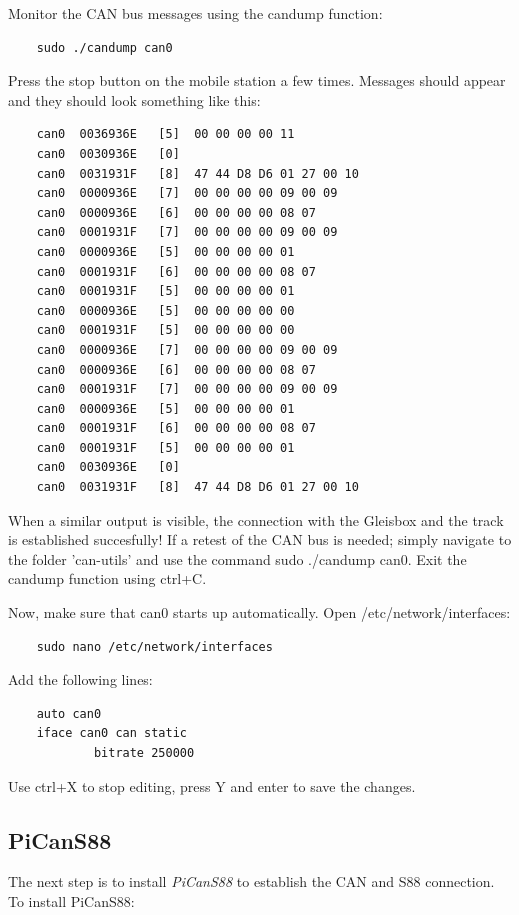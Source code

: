 Monitor the CAN bus messages using the candump function:

\begin{verbatim}
	sudo ./candump can0
\end{verbatim}

Press the stop button on the mobile station a few times. Messages should appear and they should look something like this:

\begin{verbatim}
	can0  0036936E   [5]  00 00 00 00 11
	can0  0030936E   [0]
	can0  0031931F   [8]  47 44 D8 D6 01 27 00 10
	can0  0000936E   [7]  00 00 00 00 09 00 09
	can0  0000936E   [6]  00 00 00 00 08 07
	can0  0001931F   [7]  00 00 00 00 09 00 09
	can0  0000936E   [5]  00 00 00 00 01
	can0  0001931F   [6]  00 00 00 00 08 07
	can0  0001931F   [5]  00 00 00 00 01
	can0  0000936E   [5]  00 00 00 00 00
	can0  0001931F   [5]  00 00 00 00 00
	can0  0000936E   [7]  00 00 00 00 09 00 09
	can0  0000936E   [6]  00 00 00 00 08 07
	can0  0001931F   [7]  00 00 00 00 09 00 09
	can0  0000936E   [5]  00 00 00 00 01
	can0  0001931F   [6]  00 00 00 00 08 07
	can0  0001931F   [5]  00 00 00 00 01
	can0  0030936E   [0]
	can0  0031931F   [8]  47 44 D8 D6 01 27 00 10
\end{verbatim}

When a similar output is visible, the connection with the Gleisbox and the track is established succesfully! If a retest of the CAN bus is needed; simply navigate to the folder 'can-utils' and use the command sudo ./candump can0. Exit the candump function using ctrl+C.

Now, make sure that can0 starts up automatically. Open /etc/network/interfaces:

\begin{verbatim}
	sudo nano /etc/network/interfaces
\end{verbatim}

Add the following lines:

\begin{verbatim}
	auto can0
	iface can0 can static
			bitrate 250000
\end{verbatim}

Use ctrl+X to stop editing, press Y and enter to save the changes.

\subsection{PiCanS88}
The next step is to install \textit{PiCanS88} to establish the CAN and S88 connection. To install PiCanS88:


